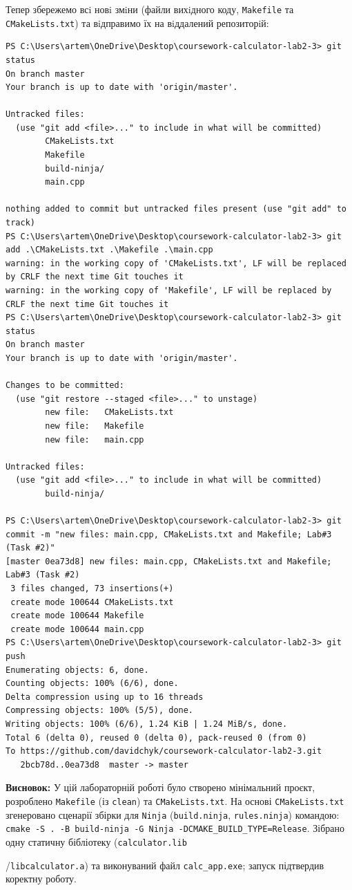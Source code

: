 \documentclass[12pt,a4paper]{article}
\begin{document}
    Тепер збережемо всi новi змiни (файли вихiдного коду, \texttt{Makefile} та \texttt{CMakeLists.txt}) та
вiдправимо їх на вiддалений репозиторiй:

    \begin{verbatim}
PS C:\Users\artem\OneDrive\Desktop\coursework-calculator-lab2-3> git status
On branch master
Your branch is up to date with 'origin/master'.

Untracked files:
  (use "git add <file>..." to include in what will be committed)
        CMakeLists.txt
        Makefile
        build-ninja/
        main.cpp

nothing added to commit but untracked files present (use "git add" to track)
PS C:\Users\artem\OneDrive\Desktop\coursework-calculator-lab2-3> git add .\CMakeLists.txt .\Makefile .\main.cpp
warning: in the working copy of 'CMakeLists.txt', LF will be replaced by CRLF the next time Git touches it
warning: in the working copy of 'Makefile', LF will be replaced by CRLF the next time Git touches it
PS C:\Users\artem\OneDrive\Desktop\coursework-calculator-lab2-3> git status
On branch master
Your branch is up to date with 'origin/master'.

Changes to be committed:
  (use "git restore --staged <file>..." to unstage)
        new file:   CMakeLists.txt
        new file:   Makefile
        new file:   main.cpp

Untracked files:
  (use "git add <file>..." to include in what will be committed)
        build-ninja/

PS C:\Users\artem\OneDrive\Desktop\coursework-calculator-lab2-3> git commit -m "new files: main.cpp, CMakeLists.txt and Makefile; Lab#3 (Task #2)"
[master 0ea73d8] new files: main.cpp, CMakeLists.txt and Makefile; Lab#3 (Task #2)
 3 files changed, 73 insertions(+)
 create mode 100644 CMakeLists.txt
 create mode 100644 Makefile
 create mode 100644 main.cpp
PS C:\Users\artem\OneDrive\Desktop\coursework-calculator-lab2-3> git push
Enumerating objects: 6, done.
Counting objects: 100% (6/6), done.
Delta compression using up to 16 threads
Compressing objects: 100% (5/5), done.
Writing objects: 100% (6/6), 1.24 KiB | 1.24 MiB/s, done.
Total 6 (delta 0), reused 0 (delta 0), pack-reused 0 (from 0)
To https://github.com/davidchyk/coursework-calculator-lab2-3.git
   2bcb78d..0ea73d8  master -> master
    \end{verbatim}

    \textbf{Висновок:} У цій лабораторній роботі було створено мінімальний проєкт,
розроблено \texttt{Makefile} (із \texttt{clean}) та \texttt{CMakeLists.txt}. На основі
\texttt{CMakeLists.txt} згенеровано сценарії збірки для \texttt{Ninja}
(\texttt{build.ninja}, \texttt{rules.ninja}) командою:
\texttt{cmake -S . -B build-ninja -G Ninja -DCMAKE\_BUILD\_TYPE=Release}. Зібрано одну
статичну бібліотеку (\texttt{calculator.lib}

/\texttt{libcalculator.a}) та
виконуваний файл \texttt{calc\_app.exe}; запуск підтвердив коректну роботу.
\end{document}
